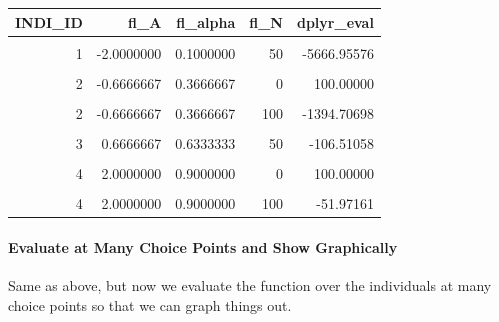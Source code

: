\documentclass[
]{book}
\begin{document}
\begin{table}[!h]
\centering
\begin{tabular}{r|r|r|r|r}
\hline
INDI\_ID & fl\_A & fl\_alpha & fl\_N & dplyr\_eval\\
\hline
\cellcolor{gray!6}{1} & \cellcolor{gray!6}{-2.0000000} & \cellcolor{gray!6}{0.1000000} & \cellcolor{gray!6}{0} & \cellcolor{gray!6}{100.00000}\\
\hline
1 & -2.0000000 & 0.1000000 & 50 & -5666.95576\\
\hline
\cellcolor{gray!6}{1} & \cellcolor{gray!6}{-2.0000000} & \cellcolor{gray!6}{0.1000000} & \cellcolor{gray!6}{100} & \cellcolor{gray!6}{-12880.28392}\\
\hline
2 & -0.6666667 & 0.3666667 & 0 & 100.00000\\
\hline
\cellcolor{gray!6}{2} & \cellcolor{gray!6}{-0.6666667} & \cellcolor{gray!6}{0.3666667} & \cellcolor{gray!6}{50} & \cellcolor{gray!6}{-595.73454}\\
\hline
2 & -0.6666667 & 0.3666667 & 100 & -1394.70698\\
\hline
\cellcolor{gray!6}{3} & \cellcolor{gray!6}{0.6666667} & \cellcolor{gray!6}{0.6333333} & \cellcolor{gray!6}{0} & \cellcolor{gray!6}{100.00000}\\
\hline
3 & 0.6666667 & 0.6333333 & 50 & -106.51058\\
\hline
\cellcolor{gray!6}{3} & \cellcolor{gray!6}{0.6666667} & \cellcolor{gray!6}{0.6333333} & \cellcolor{gray!6}{100} & \cellcolor{gray!6}{-323.94216}\\
\hline
4 & 2.0000000 & 0.9000000 & 0 & 100.00000\\
\hline
\cellcolor{gray!6}{4} & \cellcolor{gray!6}{2.0000000} & \cellcolor{gray!6}{0.9000000} & \cellcolor{gray!6}{50} & \cellcolor{gray!6}{22.55577}\\
\hline
4 & 2.0000000 & 0.9000000 & 100 & -51.97161\\
\hline
\end{tabular}
\end{table}

\hypertarget{evaluate-at-many-choice-points-and-show-graphically}{%
\paragraph{Evaluate at Many Choice Points and Show Graphically}\label{evaluate-at-many-choice-points-and-show-graphically}}

Same as above, but now we evaluate the function over the individuals at many choice points so that we can graph things out.
\end{document}

